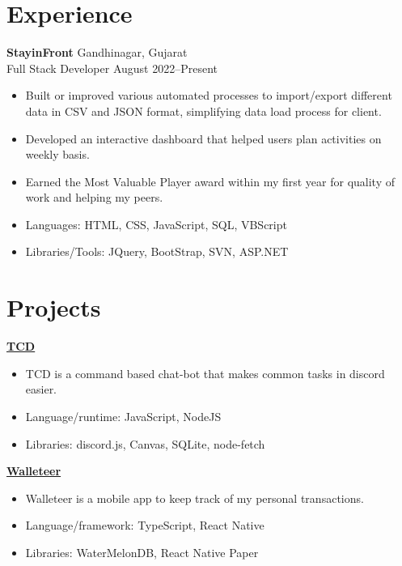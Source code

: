 \documentclass[a4paper,10pt]{article}
\begin{document}
\section{Experience}
\noindent
\textbf{StayinFront} \hfill Gandhinagar, Gujarat \\
Full Stack Developer \hfill August 2022--Present
\begin{itemize}
    \item Built or improved various automated processes to import/export different data in CSV and JSON format, simplifying data load process for client.
    \item Developed an interactive dashboard that helped users plan activities on weekly basis.
    \item Earned the Most Valuable Player award within my first year for quality of work and helping my peers.
    \item Languages: HTML, CSS, JavaScript, SQL, VBScript
    \item Libraries/Tools: JQuery, BootStrap, SVN, ASP.NET
\end{itemize}

\section{Projects}

\href{https://github.com/jaydamani/TCD}{\textbf{TCD}}
\begin{itemize}
    \item TCD is a command based chat-bot that makes common tasks in discord easier.
    \item Language/runtime: JavaScript, NodeJS
    \item Libraries: discord.js, Canvas, SQLite, node-fetch
\end{itemize}
\href{https://github.com/jaydamani/walleteer}{\textbf{Walleteer}}
\begin{itemize}
    \item Walleteer is a mobile app to keep track of my personal transactions.
    \item Language/framework: TypeScript, React Native
    \item Libraries: WaterMelonDB, React Native Paper
\end{itemize}
\end{document}
